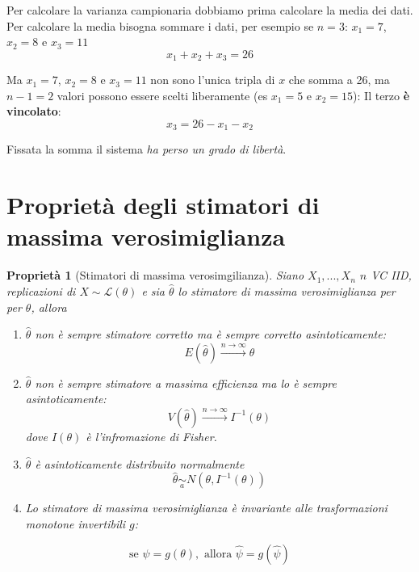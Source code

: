 \documentclass[
  11pt,
]{book}
\theoremstyle{mytheoremstyle}
\newtheorem{proposition}{Proprietà}[section]
\theoremstyle{mydefstyle}
\begin{document}
Per calcolare la varianza campionaria dobbiamo prima calcolare la media dei dati.
Per calcolare la media bisogna sommare i dati, per esempio se \(n=3\):
\(x_1=7\), \(x_2=8\) e \(x_3=11\)
\[x_1+x_2+x_3 = 26\]

Ma \(x_1=7\), \(x_2=8\) e \(x_3=11\) non sono l'unica tripla di \(x\) che somma a 26, ma
\(n-1=2\) valori possono essere scelti liberamente (es \(x_1=5\) e \(x_2=15\)):
Il terzo \textbf{è vincolato}:
\[x_3=26-x_1-x_2\]

Fissata la somma il sistema \emph{ha perso un grado di libertà}.

\section{Proprietà degli stimatori di massima verosimiglianza}\label{proprietuxe0-degli-stimatori-di-massima-verosimiglianza}

\begin{info}

\begin{proposition}[Stimatori di massima verosimgilianza]
Siano \(X_1,...,X_n\) \(n\) VC IID, replicazioni di \(X\sim \mathscr{L}(\theta)\) e sia \(\hat\theta\) lo stimatore di massima verosimiglianza per per \(\theta\), allora

\begin{enumerate}
\def\labelenumi{\arabic{enumi}.}
\item
  \(\hat\theta\) non è sempre stimatore corretto ma è sempre corretto asintoticamente:
  \[E(\hat\theta)\xrightarrow{n\to\infty}\theta\]
\item
  \(\hat\theta\) non è sempre stimatore a \emph{massima efficienza} ma lo è sempre asintoticamente:
  \[V(\hat\theta)\xrightarrow{n\to\infty}I^{-1}(\theta)\]
  dove \(I(\theta)\) è l'infromazione di Fisher.
\item
  \(\hat\theta\) è asintoticamente distribuito normalmente
  \[\hat\theta\operatorname*{\sim}_a N(\theta,I^{-1}(\theta))\]
\item
  Lo stimatore di massima verosimiglianza è invariante alle trasformazioni monotone invertibili \(g\):
\end{enumerate}

\[ \text{se } \psi=g(\theta), \text{ allora } \hat\psi = g(\hat\psi)\]
\end{proposition}

\end{info}
\end{document}
